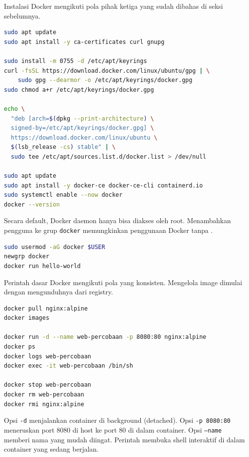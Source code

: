 Instalasi Docker mengikuti pola  pihak ketiga yang sudah dibahas di
seksi sebelumnya.

\begin{lstlisting}[language=bash, caption={Instalasi Docker Engine di Ubuntu}]
sudo apt update
sudo apt install -y ca-certificates curl gnupg

sudo install -m 0755 -d /etc/apt/keyrings
curl -fsSL https://download.docker.com/linux/ubuntu/gpg | \
    sudo gpg --dearmor -o /etc/apt/keyrings/docker.gpg
sudo chmod a+r /etc/apt/keyrings/docker.gpg

echo \
  "deb [arch=$(dpkg --print-architecture) \
  signed-by=/etc/apt/keyrings/docker.gpg] \
  https://download.docker.com/linux/ubuntu \
  $(lsb_release -cs) stable" | \
  sudo tee /etc/apt/sources.list.d/docker.list > /dev/null

sudo apt update
sudo apt install -y docker-ce docker-ce-cli containerd.io
sudo systemctl enable --now docker
docker --version
\end{lstlisting}

Secara default, Docker daemon hanya bisa diakses oleh root. Menambahkan pengguna
ke grup \texttt{docker} memungkinkan penggunaan Docker tanpa .

\begin{lstlisting}[language=bash, caption={Mengizinkan user menggunakan Docker tanpa sudo}]
sudo usermod -aG docker $USER
newgrp docker
docker run hello-world
\end{lstlisting}

Perintah dasar Docker mengikuti pola yang konsisten. Mengelola image dimulai
dengan mengunduhnya dari registry.

\begin{lstlisting}[language=bash, caption={Mengelola image dan menjalankan container}]
docker pull nginx:alpine
docker images

docker run -d --name web-percobaan -p 8080:80 nginx:alpine
docker ps
docker logs web-percobaan
docker exec -it web-percobaan /bin/sh

docker stop web-percobaan
docker rm web-percobaan
docker rmi nginx:alpine
\end{lstlisting}

Opsi \texttt{-d} menjalankan container di background (detached). Opsi \texttt{-p
8080:80} meneruskan port 8080 di host ke port 80 di dalam container. Opsi
\texttt{--name} memberi nama yang mudah diingat. Perintah 
membuka shell interaktif di dalam container yang sedang berjalan.

